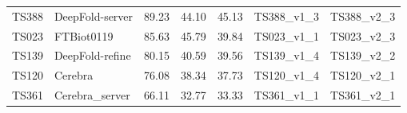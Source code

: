 \begin{table}[ht]
{\begin{tabular}{llrrrll}
TS388 & DeepFold-server & 89.23 & 44.10 & 45.13 & TS388\_v1\_3 & TS388\_v2\_3 \\ 
TS023 & FTBiot0119 & 85.63 & 45.79 & 39.84 & TS023\_v1\_1 & TS023\_v2\_3 \\ 
TS139 & DeepFold-refine & 80.15 & 40.59 & 39.56 & TS139\_v1\_4 & TS139\_v2\_2 \\ 
TS120 & Cerebra & 76.08 & 38.34 & 37.73 & TS120\_v1\_4 & TS120\_v2\_1 \\ 
TS361 & Cerebra\_server & 66.11 & 32.77 & 33.33 & TS361\_v1\_1 & TS361\_v2\_1 \\ 
\bottomrule
\end{tabular}%
}
\end{table}
